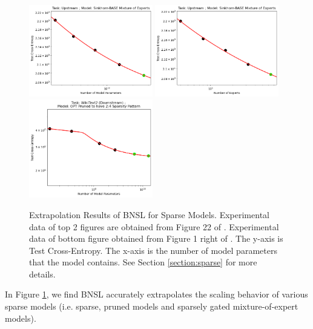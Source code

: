 \documentclass{article} %
\begin{document}
\begin{figure}[htbp]
    \centering
\includegraphics[width=0.48\textwidth]{figures/sparse/moe_sbase__params.png}
\includegraphics[width=0.48\textwidth]{figures/sparse/moe_sbase__experts.png}
\includegraphics[width=0.48\textwidth]{figures/sparse/sparsity_via_pruning.png}
\vspace{-3.5mm}
    \caption{
Extrapolation Results of BNSL for Sparse Models. Experimental data of top 2 figures are obtained from Figure 22 of \cite{clark2022unified}. Experimental data of bottom figure obtained from Figure 1 right of \cite{frantar2023massive}. The y-axis is Test Cross-Entropy. The x-axis is the number of model parameters that the model contains. See Section \ref{section:sparse} for more details.
    }
    \label{fig:sparse}
\end{figure}

In Figure \ref{fig:sparse}, we find BNSL accurately extrapolates the scaling behavior of various sparse models (i.e. sparse, pruned models and sparsely gated mixture-of-expert models).
\end{document}
